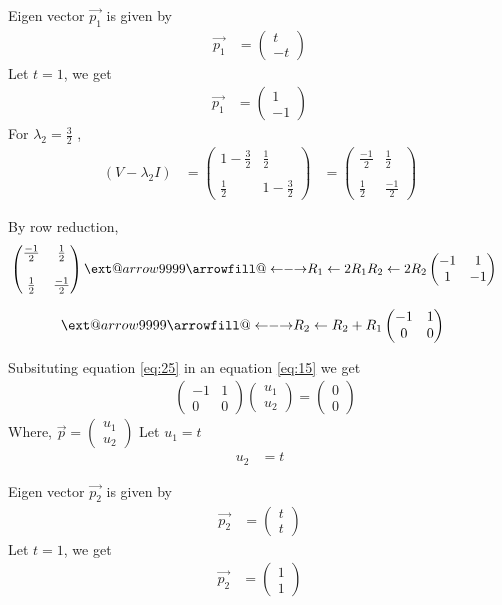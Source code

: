 \documentclass[journal,12pt,twocolumn]{IEEEtran}
\makeatletter
\newcommand\xleftrightarrow[2][]{%
  \ext@arrow 9999{\longleftrightarrowfill@}{#1}{#2}}
\newcommand\longleftrightarrowfill@{%
  \arrowfill@\leftarrow\relbar\rightarrow}
\newcommand{\myvec}[1]{\ensuremath{\begin{pmatrix}#1\end{pmatrix}}}
\makeatother
\begin{document}
Eigen vector $\vec{p_1}$ is given by
\begin{align}
    \vec{p_1}&=\myvec{t \\ -t}
\end{align}
Let $t=1$, we get
\begin{align}
        \vec{p_1}&=\myvec{1 \\-1 } \label{eq:22}
\end{align}
For $\lambda_2=\frac{3}{2}$ ,
\begin{align}
(V-\lambda_2 I)&=\myvec{1-\frac{3}{2} & \frac{1}{2} \\\\\frac{1}{2} & 1-\frac{3}{2}}
&=\myvec{\frac{-1}{2} & \frac{1}{2} \\\\\frac{1}{2} & \frac{-1}{2}}
\end{align}

By row reduction,
\begin{align}
&\myvec{\frac{-1}{2} & \frac{1}{2}\\ \\ \frac{1}{2} & \frac{-1}{2}}
\xleftrightarrow[R_1\leftarrow 2R_1]{R_2\leftarrow 2R_2}
\myvec{-1 & 1 \\ 1 & -1}
\end{align}

\begin{align}
&\xleftrightarrow{R_2\leftarrow R_2 + R_1}
\myvec{-1 & 1 \\ 0 & 0 } \label{eq:25}
\end{align}

Subsituting equation \eqref{eq:25} in an equation \eqref{eq:15} we get
\begin{align}
        &   \myvec{-1 & 1 \\ 0& 0}\myvec{u_1 \\ u_2}=\myvec{0 \\ 0}
\end{align}
Where, $\vec{p}=\myvec{u_1\\u_2}$
Let $u_1=t$
\begin{align}
    u_2&=t
\end{align}


Eigen vector $\vec{p_2}$ is given by
\begin{align}
    \vec{p_2}&=\myvec{t \\ t}
\end{align}
Let $t=1$, we get
\begin{align}
        \vec{p_2}&=\myvec{1 \\1 }\label{eq:29}
\end{align}
\end{document}
